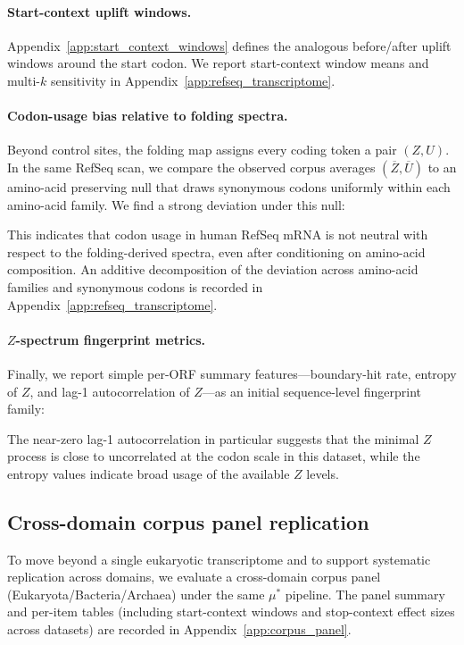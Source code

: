 \paragraph{Start-context uplift windows.}
Appendix~\ref{app:start_context_windows} defines the analogous before/after uplift windows around the start codon.
We report start-context window means and multi-$k$ sensitivity in Appendix~\ref{app:refseq_transcriptome}.

\paragraph{Codon-usage bias relative to folding spectra.}
Beyond control sites, the folding map assigns every coding token a pair $(Z,U)$.
In the same RefSeq scan, we compare the observed corpus averages $(\overline{Z},\overline{U})$ to an amino-acid preserving null that draws synonymous codons uniformly within each amino-acid family.
We find a strong deviation under this null:

This indicates that codon usage in human RefSeq mRNA is not neutral with respect to the folding-derived spectra, even after conditioning on amino-acid composition.
An additive decomposition of the deviation across amino-acid families and synonymous codons is recorded in Appendix~\ref{app:refseq_transcriptome}.

\paragraph{\texorpdfstring{$Z$}{Z}-spectrum fingerprint metrics.}
Finally, we report simple per-ORF summary features---boundary-hit rate, entropy of $Z$, and lag-1 autocorrelation of $Z$---as an initial sequence-level fingerprint family:

The near-zero lag-1 autocorrelation in particular suggests that the minimal $Z$ process is close to uncorrelated at the codon scale in this dataset, while the entropy values indicate broad usage of the available $Z$ levels.

\subsection{Cross-domain corpus panel replication}
\label{sec:corpus_panel_replication}

To move beyond a single eukaryotic transcriptome and to support systematic replication across domains, we evaluate a cross-domain corpus panel (Eukaryota/Bacteria/Archaea) under the same $\mu^\ast$ pipeline.
The panel summary and per-item tables (including start-context windows and stop-context effect sizes across datasets) are recorded in Appendix~\ref{app:corpus_panel}.


